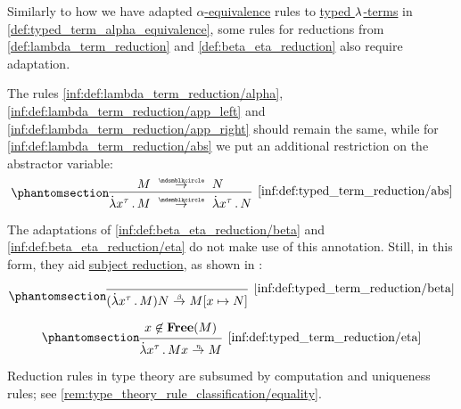 \begin{definition}\label{def:typed_term_reduction}
  Similarly to how we have adapted \hyperref[def:lambda_term_alpha_equivalence]{\( \alpha \)-equivalence} rules to \hyperref[def:typed_lambda_term]{typed \( {\mathrm \lambda} \)-terms} in \cref{def:typed_term_alpha_equivalence}, some rules for reductions from \cref{def:lambda_term_reduction} and \cref{def:beta_eta_reduction} also require adaptation.

  The rules \ref{inf:def:lambda_term_reduction/alpha}, \ref{inf:def:lambda_term_reduction/app_left} and \ref{inf:def:lambda_term_reduction/app_right} should remain the same, while for \ref{inf:def:lambda_term_reduction/abs} we put an additional restriction on the abstractor variable:
  \begin{equation*}\taglabel[\ensuremath{ \logic{Abs}_{\Anon}^{\logic{tt}} }]{inf:def:typed_term_reduction/abs}
    \begin{prooftree}
      \hypo{ M \pred N }
      \infer1[\ref{inf:def:typed_term_reduction/abs}]{ \qabs {x^\tau} M \pred \qabs {x^\tau} N }.
    \end{prooftree}
  \end{equation*}

  The adaptations of \ref{inf:def:beta_eta_reduction/beta} and \ref{inf:def:beta_eta_reduction/eta} do not make use of this annotation. Still, in this form, they aid \hyperref[con:subject_reduction]{subject reduction}, as shown in :
  \begin{paracol}{2}
    \begin{leftcolumn}
      \ParacolAlignmentHack
      \begin{equation*}\taglabel[\ensuremath{ \logic{Red}_\beta^{\logic{tt}} }]{inf:def:typed_term_reduction/beta}
        \begin{prooftree}
          \infer0[\ref{inf:def:typed_term_reduction/beta}]{ (\qabs {x^\tau} M) N \bred M[x \mapsto N] }.
        \end{prooftree}
      \end{equation*}
    \end{leftcolumn}

    \begin{rightcolumn}
      \ParacolAlignmentHack
      \begin{equation*}\taglabel[\ensuremath{ \logic{Red}_\eta^{\logic{tt}} }]{inf:def:typed_term_reduction/eta}
        \begin{prooftree}
          \hypo{ x \not\in \op*{Free}(M) }
          \infer1[\ref{inf:def:typed_term_reduction/eta}]{ \qabs {x^\tau} M x \ered M }.
        \end{prooftree}
      \end{equation*}
    \end{rightcolumn}
  \end{paracol}
\end{definition}
\begin{comments}
  \item Reduction rules in type theory are subsumed by computation and uniqueness rules; see \cref{rem:type_theory_rule_classification/equality}.
\end{comments}

